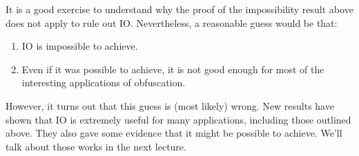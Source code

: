 \hypertarget{iodef}{}

It is a good exercise to understand why the proof of the impossibility
result above does not apply to rule out IO. Nevertheless, a reasonable
guess would be that:

\begin{enumerate}
\def\labelenumi{\arabic{enumi}.}
\item
  IO is impossible to achieve.
\item
  Even if it was possible to achieve, it is not good enough for most of
  the interesting applications of obfuscation.
\end{enumerate}

However, it turns out that this guess is (most likely) wrong. New
results have shown that IO is extremely useful for many applications,
including those outlined above. They also gave some evidence that it
might be possible to achieve. We'll talk about those works in the next
lecture.
